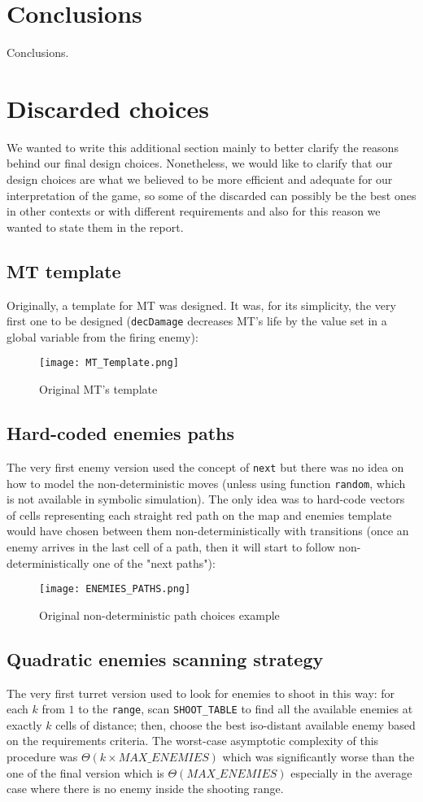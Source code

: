 \documentclass[
10pt, %
a4paper, %
oneside, %
headinclude,footinclude, %
BCOR5mm, %
]{scrartcl}
\begin{document}
			
	\section{Conclusions}
		Conclusions.
	\newpage
	\appendix
	\section{Discarded choices}
		We wanted to write this additional section mainly to better clarify the reasons behind our final design choices. Nonetheless, we would like to clarify that our design choices are what we believed to be more efficient and adequate for our interpretation of the game, so some of the discarded can possibly be the best ones in other contexts or with different requirements and also for this reason we wanted to state them in the report.
		\subsection{MT template}
			Originally, a template for MT was designed. It was, for its simplicity, the very first one to be designed (\texttt{decDamage} decreases MT's life by the value set in a global variable from the firing enemy):
			
			\begin{figure}[h!]
				\centering
				\texttt{[image: MT\_Template.png]}
				\caption{Original MT's template}
			\end{figure}
		\subsection{Hard-coded enemies paths}
			The very first enemy version used the concept of \texttt{next} but there was no idea on how to model the non-deterministic moves (unless using function \texttt{random}, which is not available in symbolic simulation). The only idea was to hard-code vectors of cells representing each straight red path on the map and enemies template would have chosen between them non-deterministically with transitions (once an enemy arrives in the last cell of a path, then it will start to follow non-deterministically one of the "next paths"):
			
			\begin{figure}[h!]
				\centering
				\texttt{[image: ENEMIES\_PATHS.png]}
				\caption{Original non-deterministic path choices example}
			\end{figure}
		\subsection{Quadratic enemies scanning strategy}
			The very first turret version used to look for enemies to shoot in this way: for each $k$ from $1$ to the \texttt{range}, scan \texttt{SHOOT\_TABLE} to find all the available enemies at exactly $k$ cells of distance; then, choose the best iso-distant available enemy based on the requirements criteria. The worst-case asymptotic complexity of this procedure was $\Theta(k\times MAX\_ENEMIES)$ which was significantly worse than the one of the final version which is $\Theta(MAX\_ENEMIES)$ especially in the average case where there is no enemy inside the shooting range.
\end{document}

